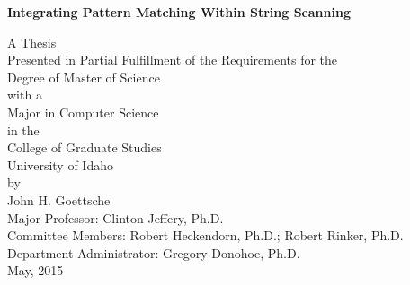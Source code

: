 \documentclass{article}
\begin{document}
\begin{titlepage}
\begin{center}
	\begin{Large}
	\textbf{Integrating Pattern Matching Within String Scanning}\\
	\end{Large}
	\begin{large}
	\vspace{5 pc}
	A Thesis\\
	Presented in Partial Fulfillment of the Requirements for the\\
	Degree of Master of Science\\
	with a\\
	Major in Computer Science\\
	in the\\
	College of Graduate Studies\\
	University of Idaho\\
	by\\John H. Goettsche\\
	\vspace{5 pc}
	Major Professor: Clinton Jeffery, Ph.D.\\
	Committee Members: Robert Heckendorn, Ph.D.; Robert Rinker, 	Ph.D.\\
	Department Administrator: Gregory Donohoe, Ph.D.\\
	\vspace{10 pc}
	May, 2015
	\end{large}
	\end{center}
\end{titlepage}

	
\thispagestyle{empty}
\end{document}
